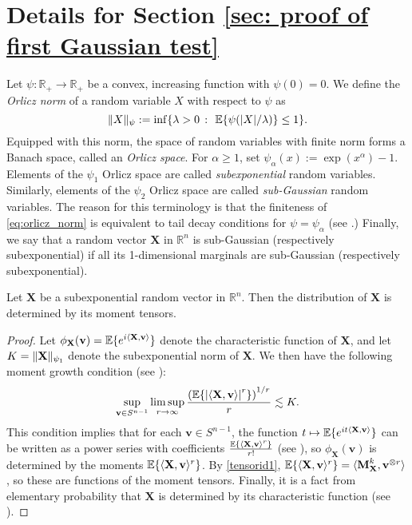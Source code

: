 \documentclass[final,12pt]{colt2018} %
\numberwithin{equation}{section}
\DeclarePairedDelimiter{\abs}{\lvert}{\rvert}
\DeclarePairedDelimiter{\norm}{\lVert}{\rVert}
\DeclarePairedDelimiter{\paren}{(}{)}
\DeclarePairedDelimiter{\braces}{\lbrace}{\rbrace}
\DeclarePairedDelimiter{\inprod}{\langle}{\rangle}
\newcommand{\E}{\mathbb{E}}
\newcommand{\R}{\mathbb{R}}
\newcommand{\boldv}{\textbf{v}}
\newcommand{\boldX}{\textbf{X}}
\newcommand{\boldM}{\textbf{M}}
\newcommand{\tensor}{\otimes}
\begin{document}
\section{Details for Section \ref{sec: proof of first Gaussian test}} \label{sec: proof of first Gaussian test appendix}

Let $\psi\colon \R_+ \to \R_+$ be a convex, increasing function with $\psi(0) = 0$. We define the \textit{Orlicz norm} of a random variable $X$ with respect to $\psi$ as
\begin{equation} \label{eq:orlicz_norm}
\norm{X}_\psi := \inf\braces*{\lambda > 0 ~\colon~ \E \braces{\psi(|X|/\lambda)} \leq 1}.
\end{equation}
Equipped with this norm, the space of random variables with finite norm forms a Banach space, called an \textit{Orlicz space}. For $\alpha \geq 1$, set $\psi_{\alpha}(x) := \exp(x^\alpha)-1$. Elements of the $\psi_1$ Orlicz space are called \textit{subexponential} random variables. Similarly, elements of the $\psi_2$ Orlicz space are called \textit{sub-Gaussian} random variables. The reason for this terminology is that the finiteness of \eqref{eq:orlicz_norm} is equivalent to tail decay conditions for $\psi = \psi_\alpha$ (see \cite{Vershynin2011b}.) Finally, we say that a random vector $\boldX$ in $\R^n$ is sub-Gaussian (respectively subexponential) if all its 1-dimensional marginals are sub-Gaussian (respectively subexponential).


\begin{lemma} \label{lem: subexponential RV characterized by moments}
	Let $\boldX$ be a subexponential random vector in $\R^n$. Then the distribution of $\boldX$ is determined by its moment tensors.
\end{lemma}

\begin{proof}
	Let $\phi_\boldX(\boldv) = \E\braces{e^{i\inprod{\boldX,\boldv}}}$ denote the characteristic function of $\boldX$, and let $K = \norm{\boldX}_{\psi_1}$ denote the subexponential norm of $\boldX$. We then have the following moment growth condition (see \cite{Vershynin2011b}):
	\begin{align} \label{moments}
	\sup_{\boldv \in S^{n-1}}\limsup_{r \to \infty} \frac{\paren*{\E\braces{\abs*{\inprod{\boldX,\boldv}}^r}}^{1/r}}{r} \lesssim K.
	\end{align}
	This condition implies that for each $\boldv \in S^{n-1}$, the function $t \mapsto \E\braces{e^{it\inprod{\boldX,\boldv}}}$ can be written as a power series with coefficients $\frac{\E\braces{\inprod{\boldX,\boldv}^r}}{r!}$ (see \cite{Billingsley1995b}), so $\phi_\boldX(\boldv)$ is determined by the moments $\E\braces{\inprod{\boldX,\boldv}^r}$. By \eqref{tensorid1}, $\E\braces{\inprod{\boldX,\boldv}^r} = \inprod{\boldM_\boldX^k,\boldv^{\tensor r}}$, so these are functions of the moment tensors. Finally, it is a fact from elementary probability that $\boldX$ is determined by its characteristic function (see \cite{Cnlar2011b}).
\end{proof}
\end{document}
